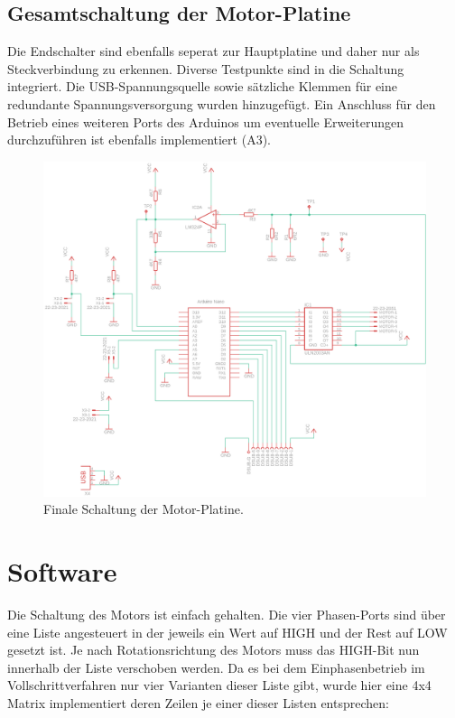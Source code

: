 \documentclass[11pt, titlepage]{report}
\begin{document}
			\subsection{Gesamtschaltung der Motor-Platine}
				Die Endschalter sind ebenfalls seperat zur Hauptplatine und daher nur als Steckverbindung zu erkennen. Diverse Testpunkte sind in die Schaltung integriert. Die USB-Spannungsquelle sowie sätzliche Klemmen für eine redundante Spannungsversorgung wurden hinzugefügt. Ein Anschluss für den Betrieb eines weiteren Ports des Arduinos um eventuelle Erweiterungen durchzuführen ist ebenfalls implementiert (A3).
				\vspace{3em}
				\begin{figure}[htbp]
					\centering
					\includegraphics[width=\linewidth]{./img/MotorComplete.png}
					\caption{Finale Schaltung der Motor-Platine.
					\label{fig:MotorComp}}			
				\end{figure}
		\newpage
		\section{Software}
		\label{sec:Software}
			Die Schaltung des Motors ist einfach gehalten. Die vier Phasen-Ports sind über eine Liste angesteuert in der jeweils ein Wert auf HIGH und der Rest auf LOW gesetzt ist. Je nach Rotationsrichtung des Motors muss das HIGH-Bit nun innerhalb der Liste verschoben werden. Da es bei dem Einphasenbetrieb im Vollschrittverfahren nur vier Varianten dieser Liste gibt, wurde hier eine 4x4 Matrix implementiert deren Zeilen je einer dieser Listen entsprechen:
\end{document}
